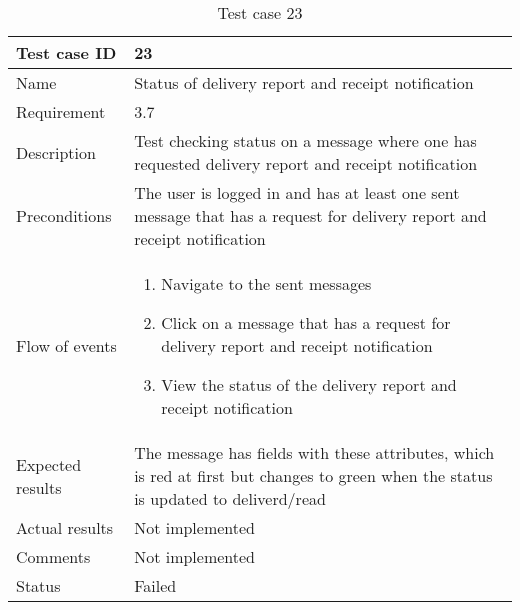 		\begin{table}
			\begin{tabular}{l|p{10cm}}
				Test case ID & 23 \\ \hline
				Name & Status of delivery report and receipt notification\\ \hline
				Requirement & 3.7\\ \hline
				Description & Test checking status on a message where one has requested delivery report and receipt notification\\ \hline
				Preconditions & The user is logged in and has at least one sent message that has a request for delivery report and receipt notification\\ \hline
				Flow of events & 
					\begin{enumerate}
						\item{}Navigate to the sent messages
						\item{}Click on a message that has a request for delivery report and receipt notification
						\item{}View the status of the delivery report and receipt notification
					\end{enumerate} \\ \hline
				Expected results & The message has fields with these attributes, which is red at first but changes to green when the status is updated to deliverd/read \\ \hline
				Actual results &Not implemented\\ \hline
				Comments & Not implemented\\ \hline
				Status & Failed\\ \hline
			\end{tabular}
			\caption{Test case 23} \label{tab:case23}
		\end{table}

